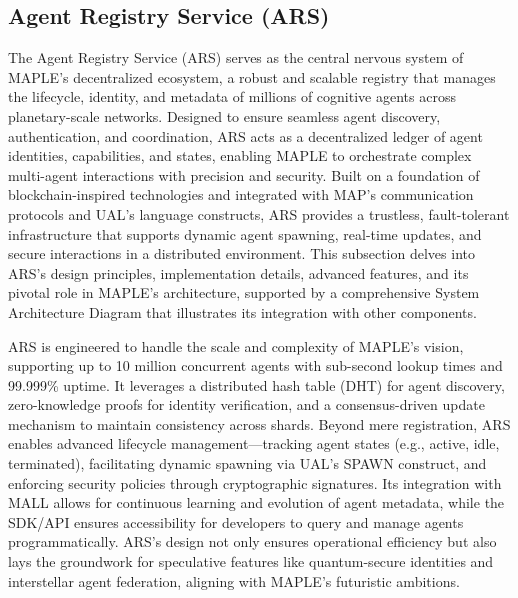 \documentclass[a4paper,11pt]{article}
\begin{document}
\pagebreak

\subsection{Agent Registry Service (ARS)}
The Agent Registry Service (ARS) serves as the central nervous system of MAPLE’s decentralized ecosystem, a robust and scalable registry that manages the lifecycle, identity, and metadata of millions of cognitive agents across planetary-scale networks. Designed to ensure seamless agent discovery, authentication, and coordination, ARS acts as a decentralized ledger of agent identities, capabilities, and states, enabling MAPLE to orchestrate complex multi-agent interactions with precision and security. Built on a foundation of blockchain-inspired technologies and integrated with MAP’s communication protocols and UAL’s language constructs, ARS provides a trustless, fault-tolerant infrastructure that supports dynamic agent spawning, real-time updates, and secure interactions in a distributed environment. This subsection delves into ARS’s design principles, implementation details, advanced features, and its pivotal role in MAPLE’s architecture, supported by a comprehensive System Architecture Diagram that illustrates its integration with other components.

ARS is engineered to handle the scale and complexity of MAPLE’s vision, supporting up to 10 million concurrent agents with sub-second lookup times and 99.999\% uptime. It leverages a distributed hash table (DHT) for agent discovery, zero-knowledge proofs for identity verification, and a consensus-driven update mechanism to maintain consistency across shards. Beyond mere registration, ARS enables advanced lifecycle management—tracking agent states (e.g., active, idle, terminated), facilitating dynamic spawning via UAL’s SPAWN construct, and enforcing security policies through cryptographic signatures. Its integration with MALL allows for continuous learning and evolution of agent metadata, while the SDK/API ensures accessibility for developers to query and manage agents programmatically. ARS’s design not only ensures operational efficiency but also lays the groundwork for speculative features like quantum-secure identities and interstellar agent federation, aligning with MAPLE’s futuristic ambitions.
\end{document}
